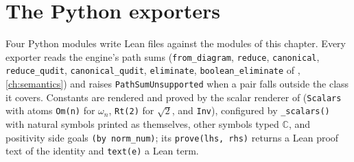 \section{The Python exporters}\label{sec:lean-pathsum-python}

Four Python modules write Lean files against the modules of this chapter. Every exporter reads
the engine's path sums (\textnormal{\texttt{from\_\allowbreak{}diagram}}, \textnormal{\texttt{reduce}}, \textnormal{\texttt{canonical}}, \textnormal{\texttt{reduce\_\allowbreak{}qudit}},
\textnormal{\texttt{canonical\_\allowbreak{}qudit}}, \textnormal{\texttt{eliminate}}, \textnormal{\texttt{boolean\_\allowbreak{}eliminate}} of
, \cref{ch:semantics}) and raises \textnormal{\texttt{PathSumUnsupported}} when a
pair falls outside the class it covers. Constants are rendered and proved by the scalar renderer
of  (\textnormal{\texttt{Scalars}} with atoms \textnormal{\texttt{Om(\allowbreak{}n)}} for $\omega_n$,
\textnormal{\texttt{Rt(\allowbreak{}2)}} for $\sqrt2$, and \textnormal{\texttt{Inv}}), configured by \textnormal{\texttt{\_\allowbreak{}scalars(\allowbreak{})}} with natural symbols printed as
themselves, other symbols typed \textnormal{\texttt{\ensuremath{\mathbb{C}}}}, and positivity side goals \textnormal{\texttt{(\allowbreak{}by norm\_\allowbreak{}num)}}; its
\textnormal{\texttt{prove(\allowbreak{}lhs,\allowbreak{} rhs)}} returns a Lean proof text of the identity and \textnormal{\texttt{text(\allowbreak{}e)}} a Lean term.

\subsection{\texorpdfstring{}{lean\_pathsum}}

